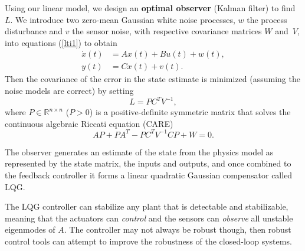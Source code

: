 \documentclass[12pt,lot, lof]{puthesis}
\begin{document}
Using our linear model, we design an \textbf{optimal observer} (Kalman filter) to find~$L$.
We introduce two zero-mean Gaussian white noise processes, $w$ the process disturbance and $v$ the sensor noise, with respective covariance matrices $W$ and~$V$, into equations (\ref{lti1}) to obtain
\begin{align}
	\dot{x}(t) &= A x(t) + B u(t) + w(t),\\
	y(t) &= C x(t) + v(t). 
\end{align}
Then the covariance of the error in the state estimate is minimized (assuming the noise models are correct) by setting
\begin{equation}
	L = P C^T V^{-1},
\end{equation}
where $P \in \mathbb{R}^{n \times n}$ ($P>0$)  is a positive-definite symmetric matrix that solves the continuous algebraic Riccati equation (CARE)
\begin{equation}
A {P} + P {A}^T - P {C}^T V^{-1} C P + W = 0.
\end{equation}

The observer generates an estimate of the state from the physics model as represented by the state matrix, the inputs and outputs, and once combined to the feedback controller it forms a linear quadratic Gaussian compensator called LQG.

The LQG controller can stabilize any plant that is detectable and stabilizable, meaning that the actuators can \emph{control} and the sensors can \emph{observe} all unstable eigenmodes of $A$. The controller may not always be robust though, then robust control tools can attempt to improve the robustness of the closed-loop systems.
\end{document}
